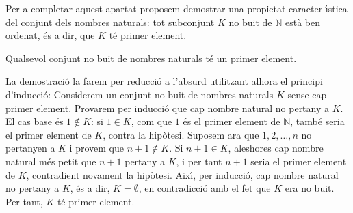 \bigskip

Per a completar aquest apartat proposem demostrar una propietat caracter%
\'{\i}stica del conjunt dels nombres naturals: tot subconjunt $K$ no buit de
$\mathbb{N}$ est\`{a} ben ordenat, \'{e}s a dir, que $K$ t\'{e} primer
element.

\begin{teorema}
Qualsevol conjunt no buit de nombres naturals t\'{e} un primer element.
\end{teorema}

\begin{prova}
La demostraci\'{o} la farem per reducci\'{o} a l'absurd utilitzant alhora el
principi d'inducci\'{o}: Considerem un conjunt no buit de nombres naturals $K$
sense cap primer element. Provarem per inducci\'{o} que cap nombre natural no
pertany a $K$. El cas base \'{e}s $1\notin K$: si $1\in K$, com que $1$ \'{e}s
el primer element de $\mathbb{N}$, tamb\'{e} seria el primer element de $K$,
contra la hip\`{o}tesi. Suposem ara que $1,2,\ldots,n$ no pertanyen a $K$ i
provem que $n+1\notin K$. Si $n+1\in K$, aleshores cap nombre natural m\'{e}s
petit que $n+1$ pertany a $K$, i per tant $n+1$ seria el primer element de
$K$, contradient novament la hip\`{o}tesi. Aix\'{\i}, per inducci\'{o}, cap
nombre natural no pertany a $K$, \'{e}s a dir, $K=\emptyset$, en contradicci\'{o}
amb el fet que $K$ era no buit. Per tant, $K$ t\'{e} primer element.
\end{prova}